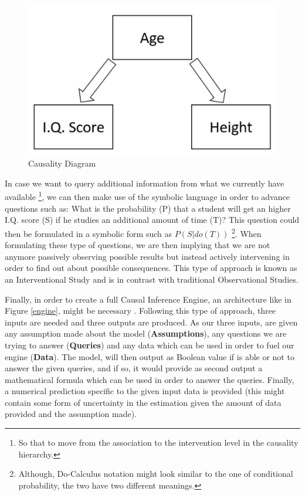 \begin{figure}[ht!]%
    \centering
    \includegraphics[width=0.4\linewidth]{latex/images/caus_d.pdf}
    \vspace{-0.2cm}
    \caption{Causality Diagram}
    \label{dig_ex}
\end{figure}
\vspace{-0.5cm}

In case we want to query additional information from what we currently have available \footnote{So that to move from the association to the intervention level in the causality hierarchy.}, we can then make use of the symbolic language in order to advance questions such as: What is the probability (P) that a student will get an higher I.Q. score (S) if he studies an additional amount of time (T)? This question could then be formulated in a symbolic form such as $P(S|do(T))$  \footnote{Although, Do-Calculus notation might look similar to the one of conditional probability, the two have two different meanings.}. When formulating these type of questions, we are then implying that we are not anymore passively observing possible results but instead actively intervening in order to find out about possible consequences. This type of approach is known as an Interventional Study and is in contrast with traditional Observational Studies.

Finally, in order to create a full Causal Inference Engine, an architecture like in Figure \ref{engine}, might be necessary \cite{why}. Following this type of approach, three inputs are needed and three outputs are produced. As our three inputs, are given any assumption made about the model (\textbf{Assumptions}), any questions we are trying to answer (\textbf{Queries}) and any data which can be used in order to fuel our engine (\textbf{Data}). The model, will then output as Boolean value if is able or not to answer the given queries, and if so, it would provide as second output a mathematical formula which can be used in order to answer the queries. Finally, a numerical prediction specific to the given input data is provided (this might contain some form of uncertainty in the estimation given the amount of data provided and the assumption made).  

